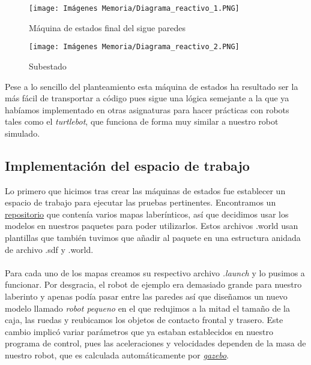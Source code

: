 \documentclass[a4paper,9pt]{article}
\begin{document}
\begin{figure}[h!]
    \centering
    \begin{minipage}{0.45\textwidth}
        \centering
        \texttt{[image: Imágenes Memoria/Diagrama\_reactivo\_1.PNG]}
        \caption{Máquina de estados final del sigue paredes}
        \label{fig:Maquina de estados Reactiva}
    \end{minipage}%
    \hspace{0.05\textwidth} %
    \begin{minipage}{0.45\textwidth}
        \centering
        \texttt{[image: Imágenes Memoria/Diagrama\_reactivo\_2.PNG]}
        \caption{Subestado}
        \label{fig:Subestado maquina reactiva}
    \end{minipage}
\end{figure}

Pese a lo sencillo del planteamiento esta máquina de estados ha resultado ser la más fácil de transportar a código 
pues sigue una lógica semejante a la que ya habíamos implementado en otras asignaturas para hacer prácticas con robots tales 
como el \textit{turtlebot}, que funciona de forma muy similar a nuestro robot simulado.

\subsection{Implementación del espacio de trabajo}
Lo primero que hicimos tras crear las máquinas de estados fue establecer un espacio de trabajo para ejecutar las pruebas pertinentes. Encontramos un \href{https://github.com/rfzeg/plywood_mazes}{repositorio}
que contenía varios mapas laberínticos, así que decidimos usar los modelos en nuestros paquetes para poder utilizarlos. Estos archivos .world usan plantillas que también tuvimos que añadir al paquete en 
una estructura anidada de archivo .sdf y .world.
\paragraph{}
Para cada uno de los mapas creamos su respectivo archivo \textit{.launch} y lo pusimos a funcionar. Por desgracia, el robot de ejemplo era demasiado grande para nuestro laberinto y apenas podía pasar entre 
las paredes así que diseñamos un nuevo modelo llamado \textit{robot pequeno} en el que redujimos a la mitad el tamaño de la caja, las ruedas y reubicamos los objetos de contacto frontal y trasero. Este cambio
implicó variar parámetros que ya estaban establecidos en nuestro programa de control, pues las aceleraciones y velocidades dependen de la masa de nuestro robot, que es calculada automáticamente por 
\href{https://gazebosim.org/home}{\textit{gazebo}}.
\end{document}
